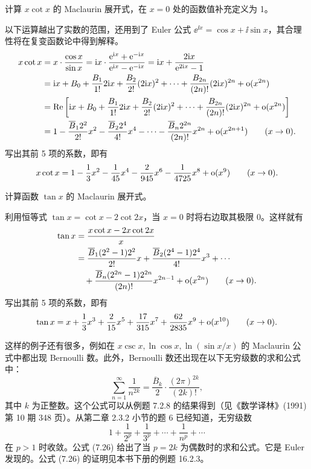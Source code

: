 \begin{xexample}[7.2.8]
计算 $x\cot x$ 的 Maclaurin 展开式，在 $x=0$ 处的函数值补充定义为 1。
\end{xexample}
\begin{xsolution}
以下运算越出了实数的范围，还用到了 Euler 公式 $\ee^{\ii x}=\cos x+\ii\sin x$，其合理性将在复变函数论中得到解释。
\[
  \begin{aligned}
  x\cot x
  &=x\cdot\frac{\cos x}{\sin x}
  =\mathrm{i} x\cdot\frac{\mathrm{e}^{\mathrm{i} x}+\mathrm{e}^{-\mathrm{i} x}}{\mathrm{e}^{\mathrm{i} x}-\mathrm{e}^{-\mathrm{i} x}}
  =\mathrm{i} x+\frac{2\mathrm{i} x}{\mathrm{e}^{2\mathrm{i} x}-1}\\
  &=\mathrm{i} x+B_0+\frac{B_1}{1!}2\mathrm{i} x+\frac{B_2}{2!}(2\mathrm{i} x)^2+\cdots+\frac{B_{2n}}{(2n)!}(2\mathrm{i} x)^{2n}+\mathrm{o}(x^{2n})\\
  &=\operatorname{Re}\left[\mathrm{i} x+B_0+\frac{B_1}{1!}2\mathrm{i} x+\frac{B_2}{2!}(2\mathrm{i} x)^2+\cdots+\frac{B_{2n}}{(2n)!}(2\mathrm{i} x)^{2n}+\mathrm{o}(x^{2n})\right]\\
  &=1-\frac{\overline B_1 2^2}{2!}x^2-\frac{\overline B_2 2^4}{4!}x^4-\cdots-\frac{\overline B_n2^{2n}}{(2n)!}x^{2n}+\mathrm{o}(x^{2n+1})\qquad(x\to0).
  \end{aligned}
\]
写出其前 5 项的系数，即有
\[
  x\cot x=1-\frac13x^2-\frac{1}{45}x^4-\frac{2}{945}x^6-\frac{1}{4725}x^8+\mathrm{o}(x^9)\qquad(x\to0).
\]
\end{xsolution}

\begin{xexample}[7.2.9]
计算函数 $\tan x$ 的 Maclaurin 展开式。
\end{xexample}
\begin{xsolution}
利用恒等式 $\tan x=\cot x-2\cot2x$，当 $x=0$ 时将右边取其极限 0。这样就有
\[
  \begin{aligned}
  \tan x
  &=\frac{x\cot x-2x\cot2x}{x}\\
  &=\frac{\overline B_1(2^2-1)2^2}{2!}x
   +\frac{\overline B_2(2^4-1)2^4}{4!}x^3+\cdots\\
  &\quad+\frac{\overline B_n(2^{2n}-1)2^{2n}}{(2n)!}x^{2n-1}+\mathrm{o}(x^{2n})\qquad(x\to0).
  \end{aligned}
\]
写出其前 5 项的系数，即有
\[
  \tan x=x+\frac13x^3+\frac{2}{15}x^5+\frac{17}{315}x^7+\frac{62}{2835}x^9+\mathrm{o}(x^{10})\qquad(x\to0).
\]
\end{xsolution}

这样的例子还有很多，例如在 $x\csc x,\ln\cos x,\ln(\sin x/x)$ 的 Maclaurin 公式中都出现 Bernoulli 数。此外，Bernoulli 数还出现在以下无穷级数的求和公式中：
\begin{equation}
  \sum_{n=1}^{\infty}\frac{1}{n^{2k}}=\frac{\overline B_k}{2}\cdot\frac{(2\pi)^{2k}}{(2k)!},
  \tag{7.26}
\end{equation}
其中 $k$ 为正整数。这个公式可以从例题 7.2.8 的结果得到（见《数学译林》(1991) 第 10 期 348 页）。从第二章 2.3.2 小节的题 6 已经知道，无穷级数
\[
  1+\frac{1}{2^p}+\frac{1}{3^p}+\cdots+\frac{1}{n^p}+\cdots
\]
在 $p>1$ 时收敛。公式 (7.26) 给出了当 $p=2k$ 为偶数时的求和公式。它是 Euler 发现的。公式 (7.26) 的证明见本书下册的例题 16.2.3。


